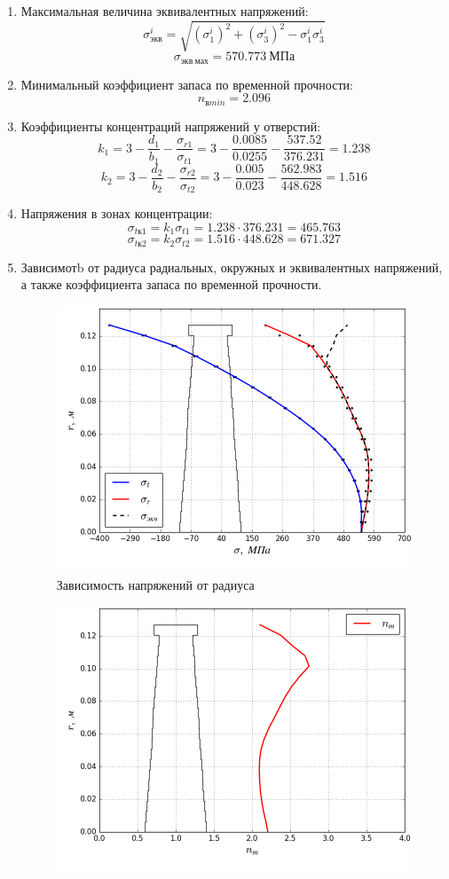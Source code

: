\documentclass[a4paper,10pt]{article}
\begin{document}
\begin{enumerate}
\item Максимальная величина эквивалентных напряжений:
\[\sigma_{экв}^i = \sqrt{(\sigma_1^i)^2 + (\sigma_3^i)^2 - \sigma_1^i \sigma_3^i}\]
\[\sigma_{экв\ мах} = 570.773\ МПа\]
\item Минимальный коэффициент запаса по временной прочности:
\[n_{в min} = 2.096\]
\item Коэффициенты концентраций напряжений у отверстий:
\[k_1 = 3 - \frac{d_1}{b_1} - \frac{\sigma_{r1}}{\sigma_{t1}} = 
3 - \frac{0.0085}{0.0255} - \frac{537.52}{376.231} = 1.238\]
\[k_2 = 3 - \frac{d_2}{b_2} - \frac{\sigma_{r2}}{\sigma_{t2}} = 
3 - \frac{0.005}{0.023} - \frac{562.983}{448.628} = 1.516\]
\item Напряжения в зонах концентрации:
\[\sigma_{tк1} = k_1 \sigma_{t1} = 1.238 \cdot 376.231 = 465.763\]
\[\sigma_{tк2} = k_2 \sigma_{t2} = 1.516 \cdot 448.628 = 671.327\]
\item Зависимотb от радиуса радиальных, окружных и эквивалентных напряжений, а также коэффициента запаса по временной прочности.
\begin{figure}[hbtp]
\centering
\includegraphics[scale=0.7]{../../strength_calculation/output/StressPlot.png}
\caption{Зависимость напряжений от радиуса}
\end{figure}
\begin{figure}[hbtp]
\centering
\includegraphics[scale=0.7]{../../strength_calculation/output/SafetyFactorPlot.png}

\end{figure}
\end{enumerate}
\end{document}
